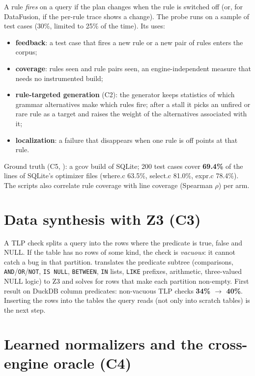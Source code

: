 A rule \emph{fires} on a query if the plan changes when the rule is switched
off (or, for DataFusion, if the per-rule trace shows a change). The probe runs on
a sample of test cases (30\%, limited to 25\% of the time). Its uses:
\begin{itemize}
  \item \textbf{feedback}: a test case that fires a new rule or a new pair of
    rules enters the corpus;
  \item \textbf{coverage}: rules seen and rule pairs seen, an engine-independent
    measure that needs no instrumented build;
  \item \textbf{rule-targeted generation} (C2): the generator keeps statistics
    of which grammar alternatives make which rules fire; after a stall it picks
    an unfired or rare rule as a target and raises the weight of the
    alternatives associated with it;
  \item \textbf{localization}: a failure that disappears when one rule is off
    points at that rule.
\end{itemize}
Ground truth (C5, ): a gcov build of SQLite; 200 test
cases cover \textbf{69.4\%} of the lines of SQLite's optimizer files (where.c
63.5\%, select.c 81.0\%, expr.c 78.4\%). The scripts also correlate rule
coverage with line coverage (Spearman $\rho$) per arm.

\section{Data synthesis with Z3 (C3)}

A TLP check splits a query into the rows where the predicate is true, false and
NULL. If the table has no rows of some kind, the check is \emph{vacuous}: it
cannot catch a bug in that partition.  translates the
predicate subtree (comparisons, \texttt{AND}/\texttt{OR}/\texttt{NOT},
\texttt{IS NULL}, \texttt{BETWEEN}, \texttt{IN} lists, \texttt{LIKE} prefixes,
arithmetic, three-valued NULL logic) to Z3 and solves for rows that make each
partition non-empty. First result on DuckDB column predicates: non-vacuous TLP
checks \textbf{34\% $\rightarrow$ 40\%}. Inserting the rows into the tables the
query reads (not only into scratch tables) is the next step.

\section{Learned normalizers and the cross-engine oracle (C4)}

